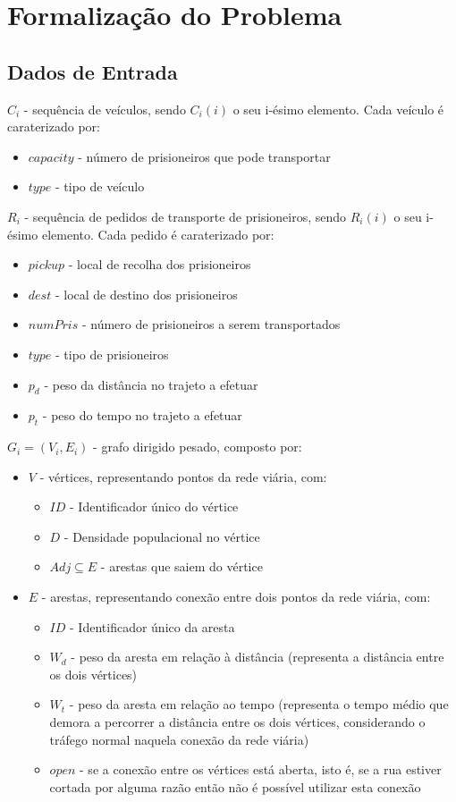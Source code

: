 \documentclass[article, a4paper, 12pt, oneside]{memoir}
\begin{document}
\chapter[Formalização do Problema][Formalização do Problema]{Formalização do Problema} \label{\thechapter}

\section{Dados de Entrada}

$C_i$ - sequência de veículos, sendo $C_i(i)$ o seu i-ésimo elemento. Cada veículo é caraterizado por:
\begin{itemize}
	\item $capacity$ - número de prisioneiros que pode transportar
	\item $type$ - tipo de veículo
\end{itemize}

$R_i$ - sequência de pedidos de transporte de prisioneiros, sendo $R_i(i)$ o seu i-ésimo elemento. Cada pedido é caraterizado por:
\begin{itemize}
	\item $pickup$ - local de recolha dos prisioneiros
	\item $dest$ - local de destino dos prisioneiros
	\item $numPris$ - número de prisioneiros a serem transportados
	\item $type$ - tipo de prisioneiros
	\item $p_d$ - peso da distância no trajeto a efetuar
	\item $p_t$ - peso do tempo no trajeto a efetuar
\end{itemize}

$G_i = (V_i, E_i)$ - grafo dirigido pesado, composto por:
\begin{itemize}
	\item $V$ - vértices, representando pontos da rede viária, com:
		\begin{itemize}
			\item $ID$ - Identificador único do vértice
			\item $D$ - Densidade populacional no vértice
			\item $Adj \subseteq E$ - arestas que saiem do vértice
		\end{itemize}
	\item $E$ - arestas, representando conexão entre dois pontos da rede viária, com:
		\begin{itemize}
			\item $ID$ - Identificador único da aresta
			\item $W_d$ - peso da aresta em relação à distância (representa a distância entre os dois vértices)
			\item $W_t$ - peso da aresta em relação ao tempo (representa o tempo médio que demora a percorrer a distância entre os dois vértices, considerando o tráfego normal naquela conexão da rede viária)
			\item $open$ - se a conexão entre os vértices está aberta, isto é, se a rua estiver cortada por alguma razão então não é possível utilizar esta conexão
		\end{itemize}
\end{itemize}
\end{document}
